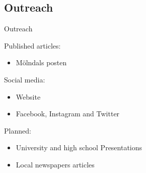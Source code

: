 \documentclass[11pt, aspectratio=169]{beamer}
\begin{document}
\subsection{Outreach}

\begin{frame}[c]{Outreach}
    \begin{minipage}[c]{0.40\linewidth}
        Published articles:
        \begin{itemize}
            \item Mölndals posten
        \end{itemize}
        Social media:        
        \begin{itemize}
            \item Website
            \item Facebook, Instagram and Twitter
        \end{itemize}
        Planned:
        \begin{itemize}
            \item University and high school Presentations
            \item Local newspapers articles
        \end{itemize}
    \end{minipage}
    \begin{minipage}[c]{0.30\linewidth}
        \begin{figure}[]
            \centering

\end{figure}
\end{minipage}
\end{frame}
\end{document}
